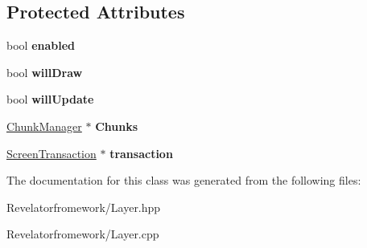 \subsection*{Protected Attributes}
\begin{DoxyCompactItemize}
\item 
\hypertarget{class_layer_af9f9c9a8c4a053bd829a06273df297bd}{bool {\bfseries enabled}}\label{class_layer_af9f9c9a8c4a053bd829a06273df297bd}

\item 
\hypertarget{class_layer_a64902a81921ba2fc792d044392b14ecc}{bool {\bfseries will\-Draw}}\label{class_layer_a64902a81921ba2fc792d044392b14ecc}

\item 
\hypertarget{class_layer_a8c3badeb437135a265c931f4ee728a48}{bool {\bfseries will\-Update}}\label{class_layer_a8c3badeb437135a265c931f4ee728a48}

\item 
\hypertarget{class_layer_ab5408f6d27ad51d73df507296f16c811}{\hyperlink{class_chunk_manager}{Chunk\-Manager} $\ast$ {\bfseries Chunks}}\label{class_layer_ab5408f6d27ad51d73df507296f16c811}

\item 
\hypertarget{class_layer_a3f0f6e109409d047c650380b6715c316}{\hyperlink{class_screen_transaction}{Screen\-Transaction} $\ast$ {\bfseries transaction}}\label{class_layer_a3f0f6e109409d047c650380b6715c316}

\end{DoxyCompactItemize}


The documentation for this class was generated from the following files\-:\begin{DoxyCompactItemize}
\item 
Revelatorfromework/Layer.\-hpp\item 
Revelatorfromework/Layer.\-cpp\end{DoxyCompactItemize}
